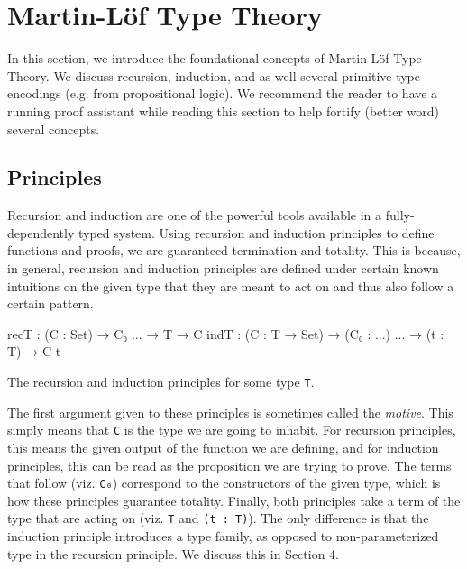 \documentclass[12pt]{article}
\begin{document}
\section{Martin-L\"of Type Theory}
In this section, we introduce the foundational concepts of Martin-L\"of Type
Theory. We discuss recursion, induction, and as well several primitive type
encodings (e.g. from propositional logic). We recommend the reader to have a
running proof assistant while reading this section to help fortify (better word)
several concepts.

\subsection*{Principles}
Recursion and induction are one of the powerful tools available in a
fully-dependently typed system. Using recursion and induction principles to
define functions and proofs, we are guaranteed termination and totality. This is
because, in general, recursion and induction principles are defined under certain
known intuitions on the given type that they are meant to act on and thus also
follow a certain pattern.
\begin{center}
\begin{minipage}{0.9\textwidth}
\begin{code}
recT : (C : Set) → C₀ ... → T → C
indT : (C : T → Set) → (C₀ : ...) ... → (t : T) → C t
\end{code}
\end{minipage}

\begin{minipage}{0.7\textwidth}
\begin{small}

The recursion and induction principles for some type {\tt T}.
\end{small}
\end{minipage}
\end{center}
The first argument given to these principles is sometimes called the {\em motive}.
This simply means that {\tt C} is the type we are going to inhabit. For recursion
principles, this means the given output of the function we are defining, and for
induction principles, this can be read as the proposition we are trying to prove.
The terms that follow (viz. {\tt C₀}) correspond to the constructors of the given
type, which is how these principles guarantee totality. Finally, both principles
take a term of the type that are acting on (viz. {\tt T} and {\tt (t : T)}). The
only difference is that the induction principle introduces a type family, as
opposed to non-parameterized type in the recursion principle. We discuss this in
Section 4.
\end{document}
